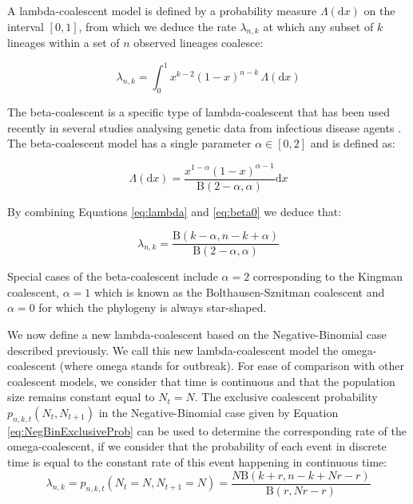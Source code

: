 \documentclass{article}
\renewcommand{\eqref}[1]{\ref{#1}}
\begin{document}
A lambda-coalescent model is defined by a probability measure 
$\Lambda(\mathrm{d} x)$ on the interval $[0,1]$, from which we deduce
the rate $\lambda_{n,k}$ at which any subset of $k$ lineages within a set of $n$ observed lineages 
coalesce:

\begin{equation}
    \lambda_{n,k} = \int_{0}^{1}{x^{k-2}(1-x)^{n-k}\,\Lambda(\mathrm{d} x)}\label{eq:lambda}
\end{equation}

The beta-coalescent \citep{schweinsbergCoalescentProcessesObtained2003} is a 
specific type of lambda-coalescent that has been used recently in several studies
analysing genetic data from infectious disease agents \citep{Hoscheit2019,Menardo2021,Helekal2024,zhangMultipleMergerCoalescent2024}.
The beta-coalescent model 
has a single parameter $\alpha \in [0,2]$ and is defined as:

\begin{equation}
\Lambda(\mathrm{d}x)=\frac{x^{1-\alpha}(1-x)^{\alpha-1}}{\mathrm{B}(2-\alpha,\alpha)}\mathrm{d}x
\label{eq:beta0}
\end{equation}

By combining Equations \eqref{eq:lambda} and \eqref{eq:beta0} we deduce that:

\begin{equation}
\lambda_{n,k}=\frac{\mathrm{B}(k-\alpha,n-k+\alpha)}{\mathrm{B}(2-\alpha,\alpha)}
\label{eq:beta}
\end{equation}

Special cases of the beta-coalescent 
include $\alpha=2$ corresponding to the Kingman coalescent,
$\alpha=1$ which is known as the Bolthausen-Sznitman coalescent
and $\alpha=0$ for which the phylogeny is always star-shaped.

We now define a new lambda-coalescent based on the Negative-Binomial case described previously. We call this new lambda-coalescent model the omega-coalescent (where omega stands
for outbreak).
For ease of comparison with other coalescent models, we consider that time is continuous
and that the population size remains constant equal to $N_t=N$. 
The exclusive coalescent probability $p_{n,k,t}(N_t, N_{t+1})$ in the Negative-Binomial case 
given by Equation \eqref{eq:NegBinExclusiveProb} can be used to determine the corresponding 
rate of the  omega-coalescent, if we consider that the probability of each event in discrete time
is equal to the constant rate of this event happening in continuous time: 
\begin{equation}
\lambda_{n,k}=p_{n,k,t}(N_t=N, N_{t+1}=N)=\frac{N \mathrm{B}(k+r, n-k+N r-r)}{\mathrm{B}(r, N r-r)}
\label{eq:omega}
\end{equation}
\end{document}
